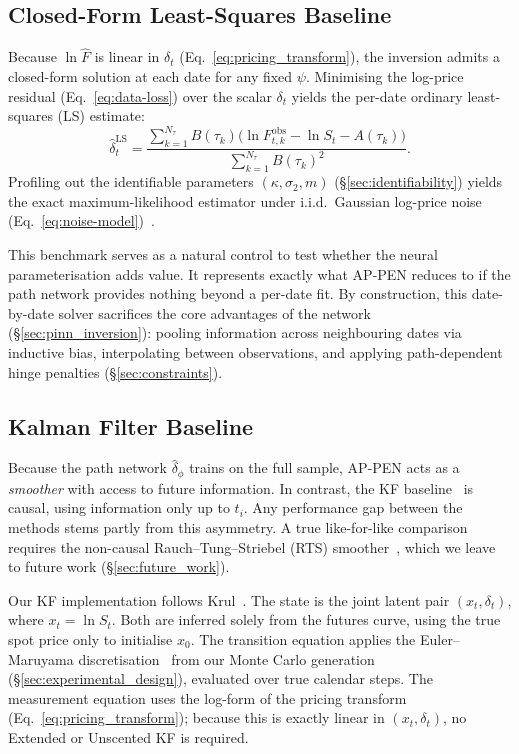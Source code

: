 \documentclass[sigconf, authorversion=true, nonacm=true]{acmart}
\begin{document}
\subsection{Closed-Form Least-Squares Baseline}
\label{sec:ls_baseline}

Because $\ln \hat{F}$ is linear in $\delta_t$ (Eq.~\ref{eq:pricing_transform}), the inversion admits a closed-form solution at each date for any fixed $\psi$. Minimising the log-price residual (Eq.~\ref{eq:data-loss}) over the scalar $\delta_t$ yields the per-date ordinary least-squares (LS) estimate:
\begin{equation}
  \label{eq:ls_delta}
  \hat{\delta}^{\text{LS}}_t
  = \frac{\sum_{k=1}^{N_\tau} B(\tau_k)\big(
      \ln F^{\text{obs}}_{t,k} - \ln S_t - A(\tau_k)\big)}
         {\sum_{k=1}^{N_\tau} B(\tau_k)^2}.
\end{equation}
Profiling out the identifiable parameters $(\kappa, \sigma_2, m)$ (\S\ref{sec:identifiability}) yields the exact maximum-likelihood estimator under i.i.d.\ Gaussian log-price noise (Eq.~\ref{eq:noise-model})~\cite{Schwartz1997TheHedging}.

This benchmark serves as a natural control to test whether the neural parameterisation adds value. It represents exactly what AP-PEN reduces to if the path network provides nothing beyond a per-date fit. By construction, this date-by-date solver sacrifices the core advantages of the network (\S\ref{sec:pinn_inversion}): pooling information across neighbouring dates via inductive bias, interpolating between observations, and applying path-dependent hinge penalties (\S\ref{sec:constraints}).


\subsection{Kalman Filter Baseline}
\label{sec:kalman}

Because the path network $\hat{\delta}_\phi$ trains on the full sample, AP-PEN acts as a \textit{smoother} with access to future information. In contrast, the KF baseline~\cite{Schwartz1997TheHedging} is causal, using information only up to $t_i$. Any performance gap between the methods stems partly from this asymmetry. A true like-for-like comparison requires the non-causal Rauch--Tung--Striebel (RTS) smoother~\cite{rauch1965maximum}, which we leave to future work (\S\ref{sec:future_work}).

Our KF implementation follows Krul~\cite{krul2008calibration}. The state is the joint latent pair $(x_t, \delta_t)$, where $x_t=\ln S_t$. Both are inferred solely from the futures curve, using the true spot price only to initialise $x_0$. The transition equation applies the Euler--Maruyama discretisation~\cite{maruyama1955continuous} from our Monte Carlo generation (\S\ref{sec:experimental_design}), evaluated over true calendar steps. The measurement equation uses the log-form of the pricing transform (Eq.~\ref{eq:pricing_transform}); because this is exactly linear in $(x_t, \delta_t)$, no Extended or Unscented KF is required. 
\end{document}

